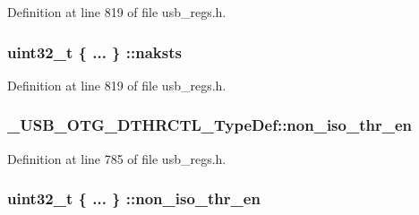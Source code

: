 Definition at line 819 of file usb\-\_\-regs.\-h.

\hypertarget{group___u_s_b___o_t_g___d_r_i_v_e_r_ga422e39280f5f159c72726174ce2d6b09}{
\subsubsection[{naksts}]{\setlength{\rightskip}{0pt plus 5cm}uint32\-\_\-t \{ ... \} \-::naksts}}\label{group___u_s_b___o_t_g___d_r_i_v_e_r_ga422e39280f5f159c72726174ce2d6b09}


Definition at line 819 of file usb\-\_\-regs.\-h.

\hypertarget{group___u_s_b___o_t_g___d_r_i_v_e_r_ga437a4ecc78a29535cb600a64f99fdded}{
\subsubsection[{non\-\_\-iso\-\_\-thr\-\_\-en}]{ \-\_\-\-U\-S\-B\-\_\-\-O\-T\-G\-\_\-\-D\-T\-H\-R\-C\-T\-L\-\_\-\-Type\-Def\-::non\-\_\-iso\-\_\-thr\-\_\-en}}\label{group___u_s_b___o_t_g___d_r_i_v_e_r_ga437a4ecc78a29535cb600a64f99fdded}


Definition at line 785 of file usb\-\_\-regs.\-h.

\hypertarget{group___u_s_b___o_t_g___d_r_i_v_e_r_ga251c7a0fa78d608b0506cb6f70bd3934}{
\subsubsection[{non\-\_\-iso\-\_\-thr\-\_\-en}]{\setlength{\rightskip}{0pt plus 5cm}uint32\-\_\-t \{ ... \} \-::non\-\_\-iso\-\_\-thr\-\_\-en}}\label{group___u_s_b___o_t_g___d_r_i_v_e_r_ga251c7a0fa78d608b0506cb6f70bd3934}



